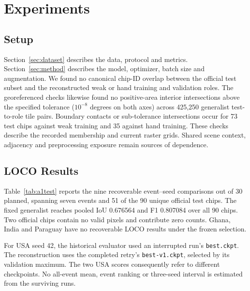 \section{Experiments}
\label{sec:experiments}

\subsection{Setup}

Section~\ref{sec:dataset} describes the data, protocol and metrics.
Section~\ref{sec:method} describes the model, optimizer, batch size
and augmentation. We found no canonical chip-ID overlap between the
official test subset and the reconstructed weak or hand training and
validation roles. The georeferenced checks likewise found no positive-area
interior intersections above the specified tolerance ($10^{-8}$ degrees
on both axes) across 425,250 generalist test-to-role tile pairs. Boundary
contacts or sub-tolerance intersections occur for 73 test chips against
weak training and 35 against hand training. These checks describe the
recorded membership and current raster grids. Shared scene context,
adjacency and preprocessing exposure remain sources of dependence.

\subsection{LOCO Results}
\label{sec:loco}

Table~\ref{tab:a1test} reports the nine recoverable event--seed comparisons
out of 30 planned, spanning seven events and 51 of the 90 unique
official test chips. The fixed generalist reaches pooled IoU 0.676564
and F1 0.807084 over all 90 chips. Two official chips contain no valid
pixels and contribute zero counts. Ghana, India and Paraguay have no
recoverable LOCO results under the frozen selection.

\begin{table}[!htbp]
\caption{Pooled water-class IoU on each event's official test chips.
Dashes indicate unavailable event-excluded results. Differences use
full-precision scores.}
\label{tab:a1test}
\centering\small

\end{table}

For USA seed 42, the historical evaluator used an interrupted run's
\texttt{best.ckpt}. The reconstruction uses the completed retry's
\texttt{best-v1.ckpt}, selected by its validation maximum. The two USA
scores consequently refer to different checkpoints. No all-event mean,
event ranking or three-seed interval is estimated from the surviving
runs.

